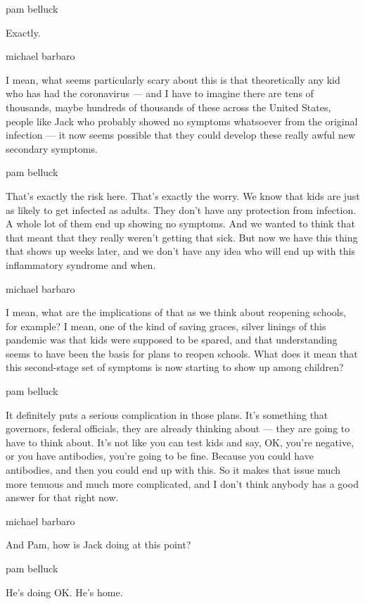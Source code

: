 pam belluck

Exactly.

michael barbaro

I mean, what seems particularly scary about this is that theoretically
any kid who has had the coronavirus --- and I have to imagine there are
tens of thousands, maybe hundreds of thousands of these across the
United States, people like Jack who probably showed no symptoms
whatsoever from the original infection --- it now seems possible that
they could develop these really awful new secondary symptoms.

pam belluck

That's exactly the risk here. That's exactly the worry. We know that
kids are just as likely to get infected as adults. They don't have any
protection from infection. A whole lot of them end up showing no
symptoms. And we wanted to think that that meant that they really
weren't getting that sick. But now we have this thing that shows up
weeks later, and we don't have any idea who will end up with this
inflammatory syndrome and when.

michael barbaro

I mean, what are the implications of that as we think about reopening
schools, for example? I mean, one of the kind of saving graces, silver
linings of this pandemic was that kids were supposed to be spared, and
that understanding seems to have been the basis for plans to reopen
schools. What does it mean that this second-stage set of symptoms is now
starting to show up among children?

pam belluck

It definitely puts a serious complication in those plans. It's something
that governors, federal officials, they are already thinking about ---
they are going to have to think about. It's not like you can test kids
and say, OK, you're negative, or you have antibodies, you're going to be
fine. Because you could have antibodies, and then you could end up with
this. So it makes that issue much more tenuous and much more
complicated, and I don't think anybody has a good answer for that right
now.

michael barbaro

And Pam, how is Jack doing at this point?

pam belluck

He's doing OK. He's home.

